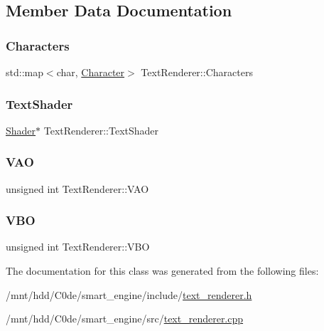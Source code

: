 \subsection{Member Data Documentation}
\mbox{\label{classTextRenderer_af7bc364007cd449284e88024c59722ba}} 
\subsubsection{\texorpdfstring{Characters}{Characters}}
{\footnotesize\ttfamily std\+::map$<$char, \hyperlink{structCharacter}{Character}$>$ Text\+Renderer\+::\+Characters}

\mbox{\label{classTextRenderer_a6faaf96f0f68a45b788a8afdd3847423}} 
\subsubsection{\texorpdfstring{Text\+Shader}{TextShader}}
{\footnotesize\ttfamily \hyperlink{classShader}{Shader}$\ast$ Text\+Renderer\+::\+Text\+Shader}

\mbox{\label{classTextRenderer_a7fb9e3a97f3e8438907bdde62d99bb6f}} 
\subsubsection{\texorpdfstring{V\+AO}{VAO}}
{\footnotesize\ttfamily unsigned int Text\+Renderer\+::\+V\+AO\hspace{0.3cm}{\ttfamily [private]}}

\mbox{\label{classTextRenderer_adcc1ce916e977bb17cc008f820e69b18}} 
\subsubsection{\texorpdfstring{V\+BO}{VBO}}
{\footnotesize\ttfamily unsigned int Text\+Renderer\+::\+V\+BO\hspace{0.3cm}{\ttfamily [private]}}



The documentation for this class was generated from the following files\+:\begin{DoxyCompactItemize}
\item 
/mnt/hdd/\+C0de/smart\+\_\+engine/include/\hyperlink{text__renderer_8h}{text\+\_\+renderer.\+h}\item 
/mnt/hdd/\+C0de/smart\+\_\+engine/src/\hyperlink{text__renderer_8cpp}{text\+\_\+renderer.\+cpp}\end{DoxyCompactItemize}
